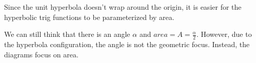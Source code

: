 \documentclass{ximera}
\begin{document}
Since the unit hyperbola doesn't wrap around the origin, it is easier for the hyperbolic trig functions to be parameterized by area.



We can still think that there is an angle $\alpha$ and $area = A = \frac{\alpha}{2}$.  However, due to the hyperbola configuration, the angle is not the geometric focus.  Instead, the diagrams focus on area.
\end{document}
